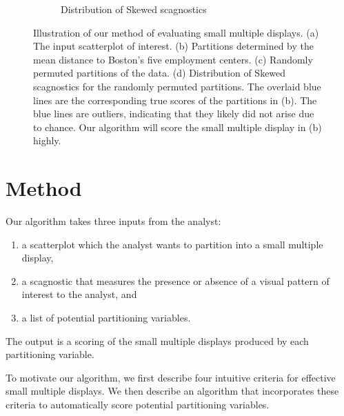 \begin{figure}
\begin{subfigure}[t]{2.5in}
	\caption{Distribution of Skewed scagnostics}
	 \label{fig:method_dist}
     \end{subfigure}
   \caption{Illustration of our method of evaluating small multiple displays. (a) The input scatterplot of interest. (b) Partitions determined by the mean distance to Boston's five employment centers. (c) Randomly permuted partitions of the data. (d) Distribution of Skewed scagnostics for the randomly permuted partitions. The overlaid blue lines are the corresponding true scores of the partitions in (b). The blue lines are outliers, indicating that they likely did not arise due to chance. Our algorithm will score the small multiple display in (b) highly.}
\end{figure}


\section{Method}
\label{sec:method}

Our algorithm takes three inputs from the analyst:
\begin{enumerate}
\item a scatterplot which the analyst wants to partition into a small multiple display,
\item a scagnostic that measures the presence or absence of a visual pattern of interest to the analyst, and
\item a list of potential partitioning variables.
\end{enumerate}
The output is a scoring of the small multiple displays produced by each partitioning variable.

To motivate our algorithm, we first describe four intuitive criteria for effective small multiple displays. We then describe an algorithm that incorporates these criteria to automatically score potential partitioning variables. 

